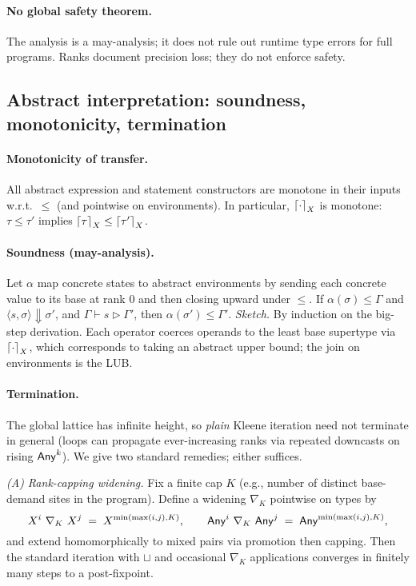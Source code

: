\paragraph{No global safety theorem.}
The analysis is a may-analysis; it does not rule out runtime type errors for full programs. Ranks document precision loss; they do not enforce safety.

\subsection{Abstract interpretation: soundness, monotonicity, termination}

\paragraph{Monotonicity of transfer.}
All abstract expression and statement constructors are monotone in their inputs w.r.t.\ $\le$ (and pointwise on environments). In particular, $\left\lceil \cdot \right\rceil_X$ is monotone: $\tau\le\tau'$ implies $\left\lceil \tau \right\rceil_X \le \left\lceil \tau' \right\rceil_X$.

\paragraph{Soundness (may-analysis).}
Let $\alpha$ map concrete states to abstract environments by sending each concrete value to its base at rank $0$ and then closing upward under $\le$.
If $\alpha(\sigma)\le \Gamma$ and $\langle s,\sigma\rangle \Downarrow \sigma'$, and $\Gamma \vdash s \triangleright \Gamma'$, then $\alpha(\sigma') \le \Gamma'$.
\emph{Sketch.} By induction on the big-step derivation. Each operator coerces operands to the least base supertype via $\left\lceil \cdot \right\rceil_X$, which corresponds to taking an abstract upper bound; the join on environments is the LUB.

\paragraph{Termination.}
The global lattice has infinite height, so \emph{plain} Kleene iteration need not terminate in general (loops can propagate ever-increasing ranks via repeated downcasts on rising $\mathsf{Any}^{k}$).
We give two standard remedies; either suffices.

\smallskip
\noindent\emph{(A) Rank-capping widening.}
Fix a finite cap $K$ (e.g., number of distinct base-demand sites in the program).
Define a widening $\nabla_K$ pointwise on types by
\[
X^{i}\ \nabla_K\ X^{j} \;=\; X^{\min(\max(i,j),K)},\qquad
\Any^{i}\ \nabla_K\ \Any^{j} \;=\; \Any^{\min(\max(i,j),K)},
\]
and extend homomorphically to mixed pairs via promotion then capping. Then the standard iteration with $\sqcup$ and occasional $\nabla_K$ applications converges in finitely many steps to a post-fixpoint.

